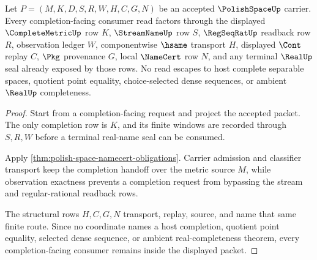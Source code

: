 \begin{theorem}
\label{thm:polish-space-completion-nonescape}
Let $P=(M,K,D,S,R,W,H,C,G,N)$ be an accepted $\PolishSpaceUp$ carrier. Every completion-facing consumer read factors through the displayed $\CompleteMetricUp$ row $K$, $\StreamNameUp$ row $S$, $\RegSeqRatUp$ readback row $R$, observation ledger $W$, componentwise $\hsame$ transport $H$, displayed $\Cont$ replay $C$, $\Pkg$ provenance $G$, local $\NameCert$ row $N$, and any terminal $\RealUp$ seal already exposed by those rows. No read escapes to host complete separable spaces, quotient point equality, choice-selected dense sequences, or ambient $\RealUp$ completeness.
\end{theorem}
\begin{proof}
Start from a completion-facing request and project the accepted packet. The only completion row is $K$, and its finite windows are recorded through $S,R,W$ before a terminal real-name seal can be consumed.

Apply \autoref{thm:polish-space-namecert-obligations}. Carrier admission and classifier transport keep the completion handoff over the metric source $M$, while observation exactness prevents a completion request from bypassing the stream and regular-rational readback rows.

The structural rows $H,C,G,N$ transport, replay, source, and name that same finite route. Since no coordinate names a host completion, quotient point equality, selected dense sequence, or ambient real-completeness theorem, every completion-facing consumer remains inside the displayed packet.
\end{proof}

